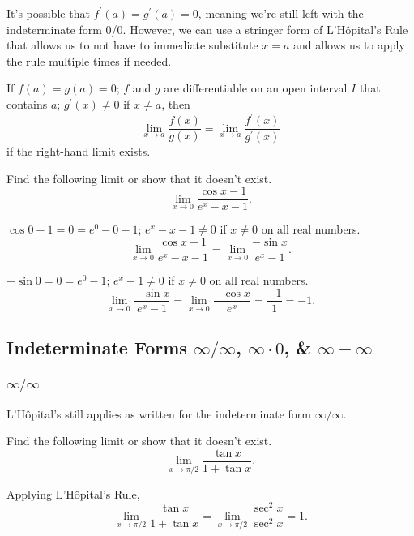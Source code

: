 It's possible that $f^\prime(a) = g^\prime(a) = 0$, meaning we're still left with the indeterminate form 0/0.
However, we can use a stringer form of L'H\^{o}pital's Rule that allows us to not have to immediate substitute $x=a$ and allows us to apply the rule multiple times if needed.
\begin{theorem}
	If $f(a)=g(a)=0$; $f$ and $g$ are differentiable on an open interval $I$ that contains $a$; $g^\prime(x)\neq 0$ if $x\neq a$, then
	\begin{equation*}
		\lim_{x\to a}{\frac{f(x)}{g(x)}} = \lim_{x\to a}{\frac{f^\prime(x)}{g^\prime(x)}}
	\end{equation*}
	if the right-hand limit exists.
\end{theorem}

\begin{example}
	Find the following limit or show that it doesn't exist.
	\begin{equation*}
		\lim_{x\to 0}{\frac{\cos{x}-1}{e^x - x - 1}}.
	\end{equation*}
\end{example}
\begin{answer}
	$\cos{0}-1 = 0 = e^0 - 0 - 1$; $e^x - x - 1 \neq 0$ if $x\neq 0$ on all real numbers.
	\begin{equation*}
		\lim_{x\to 0}{\frac{\cos{x}-1}{e^x - x - 1}} = \lim_{x\to 0}{\frac{-\sin{x}}{e^x - 1}}.
	\end{equation*}
	
	$-\sin{0} = 0 = e^0 - 1$; $e^x - 1 \neq 0$ if $x\neq 0$ on all real numbers.
	\begin{equation*}
		\lim_{x\to 0}{\frac{-\sin{x}}{e^x - 1}} = \lim_{x\to 0}{\frac{-\cos{x}}{e^x}} = \frac{-1}{1} = -1.
	\end{equation*}
\end{answer}

\subsection{Indeterminate Forms $\infty/\infty$, $\infty\cdot 0$, \& $\infty - \infty$}
\subsubsection{$\infty/\infty$}
L'H\^{o}pital's still applies as written for the indeterminate form $\infty/\infty$.

\begin{example}
	Find the following limit or show that it doesn't exist.
	\begin{equation*}
		\lim_{x\to\pi/2}\frac{\tan{x}}{1+\tan{x}}.
	\end{equation*}
\end{example}
\begin{answer}
	Applying L'H\^{o}pital's Rule,
	\begin{equation*}
		\lim_{x\to\pi/2}{\frac{\tan{x}}{1+\tan{x}}} = \lim_{x\to\pi/2}\frac{\sec^2{x}}{\sec^2{x}} = 1.
	\end{equation*}
\end{answer}

